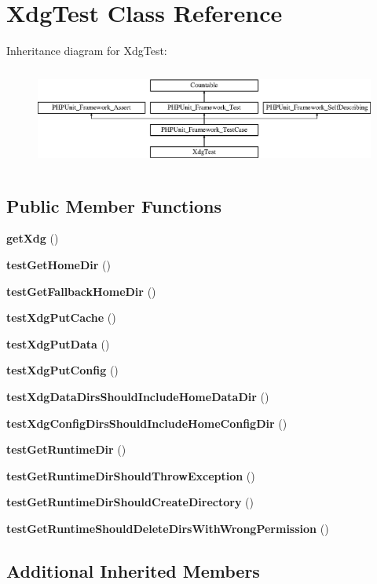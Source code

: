 \section{Xdg\+Test Class Reference}
\label{class_xdg_test}
Inheritance diagram for Xdg\+Test\+:\begin{figure}[H]
\begin{center}
\leavevmode
\includegraphics[height=3.303835cm]{class_xdg_test}
\end{center}
\end{figure}
\subsection*{Public Member Functions}
\begin{DoxyCompactItemize}
\item 
{\bf get\+Xdg} ()
\item 
{\bf test\+Get\+Home\+Dir} ()
\item 
{\bf test\+Get\+Fallback\+Home\+Dir} ()
\item 
{\bf test\+Xdg\+Put\+Cache} ()
\item 
{\bf test\+Xdg\+Put\+Data} ()
\item 
{\bf test\+Xdg\+Put\+Config} ()
\item 
{\bf test\+Xdg\+Data\+Dirs\+Should\+Include\+Home\+Data\+Dir} ()
\item 
{\bf test\+Xdg\+Config\+Dirs\+Should\+Include\+Home\+Config\+Dir} ()
\item 
{\bf test\+Get\+Runtime\+Dir} ()
\item 
{\bf test\+Get\+Runtime\+Dir\+Should\+Throw\+Exception} ()
\item 
{\bf test\+Get\+Runtime\+Dir\+Should\+Create\+Directory} ()
\item 
{\bf test\+Get\+Runtime\+Should\+Delete\+Dirs\+With\+Wrong\+Permission} ()
\end{DoxyCompactItemize}
\subsection*{Additional Inherited Members}


